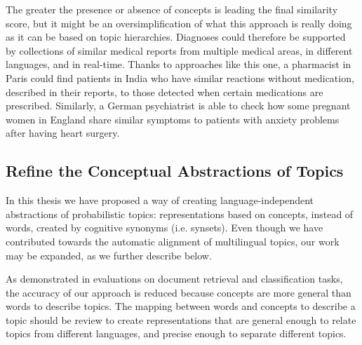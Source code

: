 The greater the presence or absence of concepts is leading the final similarity score, but it might be an oversimplification of what this approach is really doing as it can be based on topic hierarchies. Diagnoses could therefore be supported by collections of similar medical reports from multiple medical areas, in different languages, and in real-time. Thanks to approaches like this one, a pharmacist in Paris could find patients in India who have similar reactions without medication, described in their reports, to those detected when certain medications are prescribed. Similarly, a German psychiatrist is able to check how some pregnant women in England share similar symptoms to patients with anxiety problems after having heart surgery.

\subsection{Refine the Conceptual Abstractions of Topics }

In this thesis we have proposed a way of creating language-independent abstractions of probabilistic topics: representations based on concepts, instead of words, created by cognitive synonyms (i.e. synsets). Even though we have contributed towards the automatic alignment of multilingual topics, our work may be expanded, as we further describe below. 

As demonstrated in evaluations on document retrieval and classification tasks, the accuracy of our approach is reduced because concepts are more general than words to describe topics. The mapping between words and concepts to describe a topic should be review to create representations that are general enough to relate topics from different languages, and precise enough to separate different topics. 
